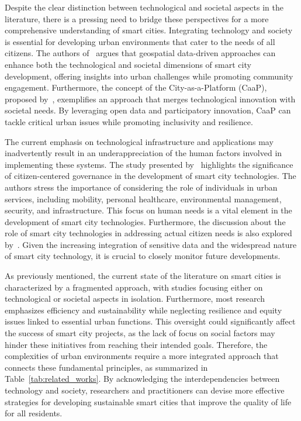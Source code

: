 \documentclass[smartcities,article,submit,pdftex,moreauthors]{Definitions/mdpi}
\begin{document}
Despite the clear distinction between technological and societal aspects in the literature, there is a pressing need to bridge these perspectives for a more comprehensive understanding of smart cities. Integrating technology and society is essential for developing urban environments that cater to the needs of all citizens. The authors of~\cite{costaAchievingSustainableSmart2024} argues that geospatial data-driven approaches can enhance both the technological and societal dimensions of smart city development, offering insights into urban challenges while promoting community engagement. Furthermore, the concept of the City-as-a-Platform (CaaP), proposed by~\cite{repetteCityAsPlatformDevelopment2021}, exemplifies an approach that merges technological innovation with societal needs. By leveraging open data and participatory innovation, CaaP can tackle critical urban issues while promoting inclusivity and resilience.

The current emphasis on technological infrastructure and applications may inadvertently result in an underappreciation of the human factors involved in implementing these systems. The study presented by~\cite{javedFutureSmartCities2022} highlights the significance of citizen-centered governance in the development of smart city technologies. The authors stress the importance of considering the role of individuals in urban services, including mobility, personal healthcare, environmental management, security, and infrastructure. This focus on human needs is a vital element in the development of smart city technologies. Furthermore, the discussion about the role of smart city technologies in addressing actual citizen needs is also explored by~\cite{kirimtatFutureTrendsCurrent2020}. Given the increasing integration of sensitive data and the widespread nature of smart city technology, it is crucial to closely monitor future developments. 

As previously mentioned, the current state of the literature on smart cities is characterized by a fragmented approach, with studies focusing either on technological or societal aspects in isolation. Furthermore, most research emphasizes efficiency and sustainability while neglecting resilience and equity issues linked to essential urban functions. This oversight could significantly affect the success of smart city projects, as the lack of focus on social factors may hinder these initiatives from reaching their intended goals. Therefore, the complexities of urban environments require a more integrated approach that connects these fundamental principles, as summarized in Table~\ref{tab:related_works}. By acknowledging the interdependencies between technology and society, researchers and practitioners can devise more effective strategies for developing sustainable smart cities that improve the quality of life for all residents.
\end{document}
